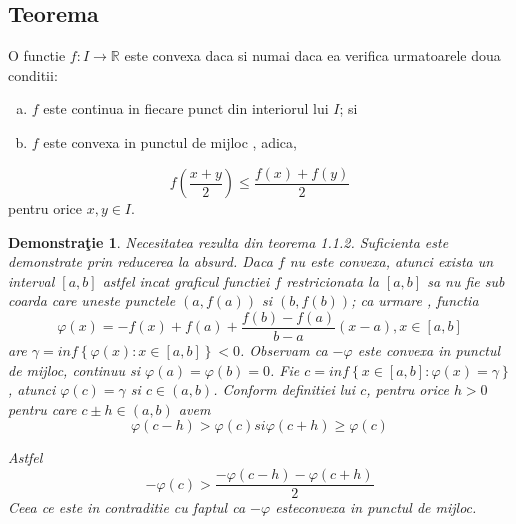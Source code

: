 \documentclass[a4paper,12pt,oneside]{report}
\newtheorem{demonstration}{Demonstra\c tie}
\begin{document}
\subsection{Teorema}
O functie \(f : I \rightarrow \mathbb{R}\) este convexa daca si numai daca ea verifica urmatoarele doua conditii:
\begin{enumerate}[a)]
\item \(f\) este continua in fiecare punct din interiorul lui \(I\); si
\item \(f\) este convexa in punctul de mijloc , adica, 
\end{enumerate}

\begin{displaymath}
  f\left ( \frac{x+y}{2} \right )\leq \frac{f\left ( x \right )+f\left ( y \right )}{2}
\end{displaymath}
pentru orice \(x, y \in I\). 


\begin{demonstration}
Necesitatea rezulta din teorema 1.1.2. Suficienta este demonstrate prin reducerea la absurd. Daca \(f\) nu este convexa, atunci exista un interval \(\left [ a,b \right ]\) astfel incat graficul functiei \(f\) restricionata la  \(\left [ a,b \right ]\) sa nu fie sub coarda care uneste punctele \(\left ( a, f\left ( a \right ) \right )\) si \(\left ( b, f\left ( b \right ) \right )\); ca urmare , functia
\begin{displaymath}
  \varphi \left ( x \right )= -f\left ( x \right ) + f\left ( a \right )+ \frac{f\left ( b \right )- f\left ( a \right )}{b-a}\left ( x-a \right ), x\in \left [ a,b \right ]
\end{displaymath}
are  \(\gamma = inf \left \{ \varphi \left ( x \right ) : x\in \left [ a,b \right ]\right \}< 0\). Observam ca \(-\varphi\) este convexa in punctul de mijloc, continuu si \(\varphi \left ( a \right ) =\varphi \left ( b \right ) = 0\). Fie \(c = inf \left \{ x \in \left [ a,b  \right ] : \varphi \left ( x \right )= \gamma \right \} \), atunci \(\varphi \left ( c \right ) = \gamma\)  si \(c \in \left ( a,b  \right )\). Conform definitiei lui \(c\), pentru orice \(h>0\) pentru care \(c\pm h\in \left ( a,b \right )\) avem 
\begin{displaymath}
  \varphi \left ( c - h  \right )> \varphi \left ( c \right ) si \varphi \left ( c + h  \right )\geq  \varphi \left ( c \right )
\end{displaymath}

Astfel 
\begin{displaymath}
  -\varphi \left ( c \right )> \frac{-\varphi \left ( c-h \right )-\varphi \left ( c+h \right )}{2} 
\end{displaymath}
Ceea ce este in contraditie cu faptul ca \(-\varphi\) esteconvexa in punctul de mijloc. 
\end{demonstration}
\end{document}
